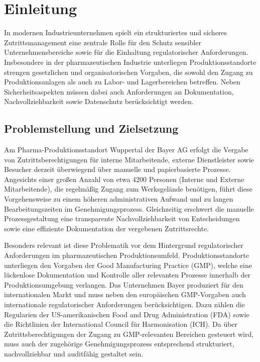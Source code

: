 \documentclass[
  12pt,
  a4paper,
  oneside,
  headings=normal,
  numbers=noendperiod
]{scrreprt}
\numberwithin{equation}{chapter}
\begin{document}
\label{test:chapter-start}
\chapter{Einleitung}

In modernen Industrieunternehmen spielt ein strukturiertes und sicheres
Zutrittsmanagement eine zentrale Rolle für den Schutz sensibler
Unternehmensbereiche sowie für die Einhaltung regulatorischer Anforderungen.
Insbesondere in der pharmazeutischen Industrie unterliegen Produktionsstandorte
strengen gesetzlichen und organisatorischen Vorgaben, die sowohl den Zugang zu
Produktionsanlagen als auch zu Labor- und Lagerbereichen betreffen. Neben
Sicherheitsaspekten müssen dabei auch Anforderungen an Dokumentation,
Nachvollziehbarkeit sowie Datenschutz berücksichtigt werden.

\section{Problemstellung und Zielsetzung}

Am Pharma-Produktionsstandort Wuppertal der Bayer AG erfolgt die Vergabe von
Zutrittsberechtigungen für interne Mitarbeitende, externe Dienstleister sowie
Besucher derzeit überwiegend über manuelle und papierbasierte Prozesse.
Angesichts einer großen Anzahl von etwa 4200 Personen (Interne und Externe
Mitarbeitende), die regelmäßig Zugang zum Werksgelände benötigen, führt diese
Vorgehensweise zu einem höheren administrativen Aufwand und zu langen
Bearbeitungszeiten im Genehmigungsprozess. Gleichzeitig erschwert die manuelle
Prozessgestaltung eine transparente Nachvollziehbarkeit von Entscheidungen sowie
eine effiziente Dokumentation der vergebenen Zutrittsrechte.

Besonders relevant ist diese Problematik vor dem Hintergrund regulatorischer
Anforderungen im pharmazeutischen Produktionsumfeld. Produktionsstandorte
unterliegen den Vorgaben der Good Manufacturing Practice (GMP), welche eine
lückenlose Dokumentation und Kontrolle aller relevanten Prozesse innerhalb der
Produktionsumgebung verlangen. Das Unternehmen Bayer produziert für den
internationalen Markt und muss neben den europäischen GMP-Vorgaben auch
internationale regulatorischer Anforderungen berücksichtigen. Dazu zählen die
Regularien der US-amerikanischen Food and Drug Administration (FDA) sowie die
Richtlinien der International Council für Harmonisation (ICH). Da über
Zutrittsberechtigungen der Zugang zu GMP-relevanten Bereichen gesteuert wird,
muss auch der zugehörige Genehmigungsprozess entsprechend strukturiert,
nachvollziehbar und auditfähig gestaltet sein.
\end{document}
